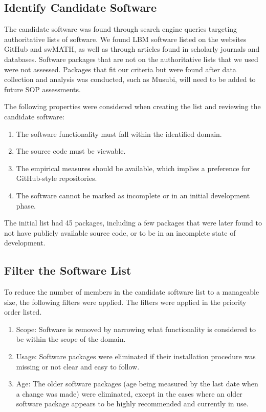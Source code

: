 \documentclass[12pt, notitlepage]{article}
\begin{document}
\subsection{Identify Candidate Software}\label{identifysoftware}

The candidate software was found through search engine queries targeting authoritative lists of software. We found LBM software listed on the websites GitHub and swMATH, as well as through articles found in scholarly journals and databases. Software packages that are not on the authoritative lists that we used were not assessed. Packages that fit our criteria but were found after data collection and analysis was conducted, such as Musubi, will need to be added to future SOP assessments.

The following properties were considered when creating the list and reviewing the candidate software:

\begin{enumerate}
	\item The software functionality must fall within the identified domain.
	\item The source code must be viewable.
	\item The empirical measures should be available, which implies a preference for GitHub-style repositories.
	\item The software cannot be marked as incomplete or in an initial development phase.
\end{enumerate}

The initial list had 45 packages, including a few packages that were later found to not have publicly available source code, or to be in an incomplete state of development. 

\subsection{Filter the Software List}\label{filtersoftware}

To reduce the number of members in the candidate software list to a manageable size, the following filters were applied. The filters were applied in the priority order listed.

\begin{enumerate}
	\item Scope: Software is removed by narrowing what functionality is considered to be within the scope of the domain.
	\item Usage: Software packages were eliminated if their installation procedure was missing or not clear and easy to follow.
	\item Age: The older software packages (age being measured by the last date when a change was made) were eliminated, except in the cases where an older software package appears to be highly recommended and currently in use. 
\end{enumerate}
\end{document}
